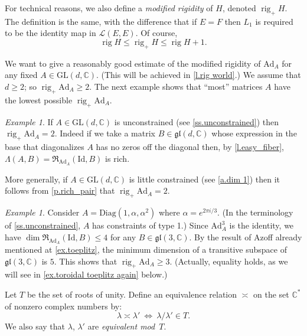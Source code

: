 \documentclass[10pt, a4paper]{amsart}
\theoremstyle{plain}
\theoremstyle{definition}
\theoremstyle{remark}
\theoremstyle{note}
\newtheorem{example}[lemma]{Example}
\numberwithin{equation}{section}
\begin{document}
For technical reasons, 
we also define a \emph{modified rigidity} of $H$, 
denoted $\operatorname{rig}_+ H$.
The definition is the same, with the difference that if $E = F$ then 
$L_1$ is required to be the identity map in $\mathcal{L}(E,E)$.
Of course,
$$
\operatorname{rig} H \le \operatorname{rig}_+ H \le \operatorname{rig} H + 1.
$$  

\medskip

We want to give a reasonably good estimate 
of the modified rigidity of ${\mathrm{Ad}}_A$ for any fixed $A \in {\mathrm{GL}}(d,{\mathbb{C}})$.
(This will be achieved in \cref{l.rig world}.)
We assume that $d \ge 2$; so $\operatorname{rig}_+ {\mathrm{Ad}}_A \ge 2$.
The next example shows that ``most'' matrices $A$ have the lowest possible $\operatorname{rig}_+ {\mathrm{Ad}}_A$.

\begin{example}\label{ex.unconstrained_rig}
If $A\in {\mathrm{GL}}(d,{\mathbb{C}})$ is unconstrained (see \cref{ss.unconstrained})
then $\operatorname{rig}_+ {\mathrm{Ad}}_A = 2$.
Indeed if we take a matrix $B \in {\mathfrak{gl}}(d,{\mathbb{C}})$ whose expression in the base that diagonalizes $A$
has no zeros off the diagonal then, by \cref{l.easy_fiber}, 
$\Lambda(A,B) = {\mathfrak{R}}_{{\mathrm{Ad}}_A}({\mathrm{Id}},B)$ is rich.

More generally, if $A\in {\mathrm{GL}}(d,{\mathbb{C}})$ is little constrained (see \cref{a.dim 1})
then it follows from \cref{p.rich_pair} that
$\operatorname{rig}_+ {\mathrm{Ad}}_A = 2$.
\end{example}	

\begin{example}\label{ex.toroidal toeplitz}
Consider $A = {\mathrm{Diag}} (1, \alpha, \alpha^2)$ where $\alpha = e^{2\pi i /3}$.
(In the terminology of \cref{ss.unconstrained}, 
$A$ has constraints of type 1.) 
Since ${\mathrm{Ad}}_A^3$ is the identity, we have $\dim {\mathfrak{R}}_{{\mathrm{Ad}}_A}({\mathrm{Id}},B) \le 4$ for any $B \in {\mathfrak{gl}}(3,{\mathbb{C}})$.
By the result of Azoff \cite{Azoff} already mentioned at \cref{ex.toeplitz}, 
the minimum dimension of a transitive subspace of ${\mathfrak{gl}}(3,{\mathbb{C}})$ is $5$.
This shows that $\operatorname{rig}_+ {\mathrm{Ad}}_A \ge 3$.
(Actually, equality holds, as we will see in \cref{ex.toroidal toeplitz again} below.)
\end{example}

\medskip

Let $T$ be the set of roots of unity.
Define an equivalence relation $\asymp$ on the set ${\mathbb{C}}^*$ of nonzero complex numbers by:
\begin{equation}\label{e.equiv rel}
\lambda \asymp \lambda' \ \Leftrightarrow \ \lambda / \lambda' \in T.
\end{equation}
We also say that $\lambda$, $\lambda'$ are \emph{equivalent mod~$T$}.
\end{document}
